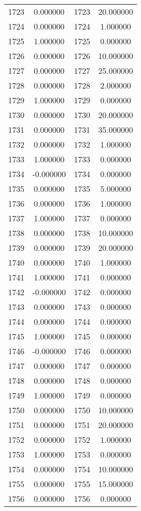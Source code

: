 \documentclass[12pt]{article}
\begin{document}
\begin{longtable}{@{}cccc@{}}
1723 & 0.000000 & 1723 & 20.000000 \\
1724 & 0.000000 & 1724 & 1.000000 \\
1725 & 1.000000 & 1725 & 0.000000 \\
1726 & 0.000000 & 1726 & 10.000000 \\
1727 & 0.000000 & 1727 & 25.000000 \\
1728 & 0.000000 & 1728 & 2.000000 \\
1729 & 1.000000 & 1729 & 0.000000 \\
1730 & 0.000000 & 1730 & 20.000000 \\
1731 & 0.000000 & 1731 & 35.000000 \\
1732 & 0.000000 & 1732 & 1.000000 \\
1733 & 1.000000 & 1733 & 0.000000 \\
1734 & -0.000000 & 1734 & 0.000000 \\
1735 & 0.000000 & 1735 & 5.000000 \\
1736 & 0.000000 & 1736 & 1.000000 \\
1737 & 1.000000 & 1737 & 0.000000 \\
1738 & 0.000000 & 1738 & 10.000000 \\
1739 & 0.000000 & 1739 & 20.000000 \\
1740 & 0.000000 & 1740 & 1.000000 \\
1741 & 1.000000 & 1741 & 0.000000 \\
1742 & -0.000000 & 1742 & 0.000000 \\
1743 & 0.000000 & 1743 & 0.000000 \\
1744 & 0.000000 & 1744 & 0.000000 \\
1745 & 1.000000 & 1745 & 0.000000 \\
1746 & -0.000000 & 1746 & 0.000000 \\
1747 & 0.000000 & 1747 & 0.000000 \\
1748 & 0.000000 & 1748 & 0.000000 \\
1749 & 1.000000 & 1749 & 0.000000 \\
1750 & 0.000000 & 1750 & 10.000000 \\
1751 & 0.000000 & 1751 & 20.000000 \\
1752 & 0.000000 & 1752 & 1.000000 \\
1753 & 1.000000 & 1753 & 0.000000 \\
1754 & 0.000000 & 1754 & 10.000000 \\
1755 & 0.000000 & 1755 & 15.000000 \\
1756 & 0.000000 & 1756 & 0.000000 \\

\end{longtable}
\end{document}
